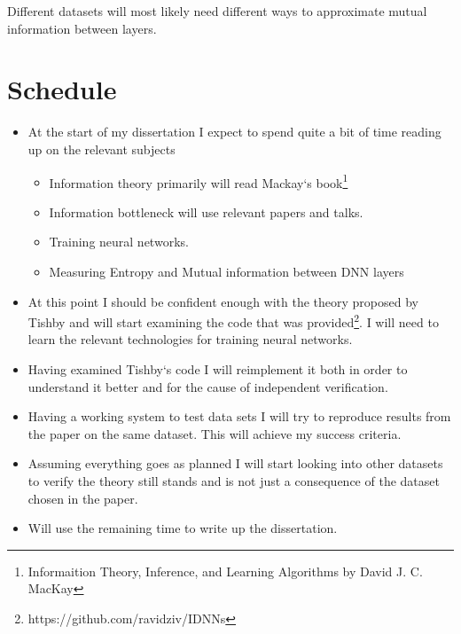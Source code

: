 \documentclass[12pt]{article}
\begin{document}
Different datasets will most likely need different ways to approximate mutual
information between layers.

\section*{Schedule}




\begin{itemize}
  \item {

      At the start of my dissertation I expect to spend quite a bit of time
      reading up on the relevant subjects
      \begin{itemize}
        \item { 
          Information theory primarily will read Mackay`s
          book\footnote{Informaition Theory, Inference, and Learning Algorithms
          by David J. C. MacKay} 
        } \item { 
          Information bottleneck will use relevant papers and talks.
        } \item {
          Training neural networks. 
        } \item {
          Measuring Entropy and Mutual information between DNN layers
        }
      \end{itemize}
  } \item {

      At this point I should be confident enough with the theory proposed by
      Tishby and will start examining the code that was
      provided\footnote{https://github.com/ravidziv/IDNNs}.  I will need to
      learn the relevant technologies for training neural networks.
  } \item {

      Having examined Tishby`s code I will reimplement it both in order to
      understand it better and for the cause of independent verification.
  } \item {

      Having a working system to test data sets I will try to reproduce results
      from the paper on the same dataset. This will achieve my success criteria.
  } \item {

      Assuming everything goes as planned I will start looking into other
      datasets to verify the theory still stands and is not just a consequence
      of the dataset chosen in the paper.
  } \item {

      Will use the remaining time to write up the dissertation.
  }
\end{itemize}
\end{document}

